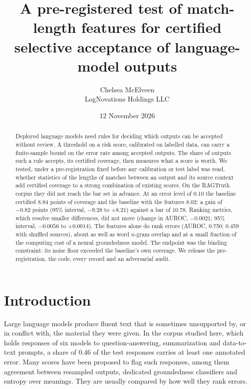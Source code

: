 \documentclass[11pt]{article}
\title{\textbf{A pre-registered test of match-length features for certified selective acceptance of language-model outputs}}
\author{Chelsea McElveen\\[2pt]{\small LogNovations Holdings LLC}}
\date{12 November 2026}
\begin{document}
\maketitle

\begin{abstract}
\noindent Deployed language models need rules for deciding which outputs can be accepted without review. A threshold on a risk score, calibrated on labelled data, can carry a finite-sample bound on the error rate among accepted outputs. The share of outputs such a rule accepts, its certified coverage, then measures what a score is worth. We tested, under a pre-registration fixed before any calibration or test label was read, whether statistics of the lengths of matches between an output and its source context add certified coverage to a strong combination of existing scores. On the RAGTruth corpus they did not reach the bar set in advance. At an error level of 0.10 the baseline certified 8.84 points of coverage and the baseline with the features 8.02: a gain of $-0.82$ points (95\% interval, $-9.28$ to $+8.21$) against a bar of 10.78. Ranking metrics, which resolve smaller differences, did not move (change in AUROC, $-0.0021$; 95\% interval, $-0.0056$ to $+0.0014$). The features alone do rank errors (AUROC, 0.750; 0.459 with shuffled sources), about as well as word $n$-gram overlap and at a small fraction of the computing cost of a neural groundedness model. The endpoint was the binding constraint: its noise floor exceeded the baseline's own coverage. We release the pre-registration, the code, every record and an adversarial audit.
\end{abstract}

\section*{Introduction}

Large language models produce fluent text that is sometimes unsupported by, or in conflict with, the material they were given. In the corpus studied here, which holds responses of six models to question-answering, summarization and data-to-text prompts\cite{ragtruth}, a share of 0.46 of the test responses carries at least one annotated error. Many scores have been proposed to flag such responses, among them agreement between resampled outputs\cite{selfcheck}, dedicated groundedness classifiers\cite{minicheck} and entropy over meanings\cite{semanticentropy}. They are usually compared by how well they rank errors.
\end{document}
